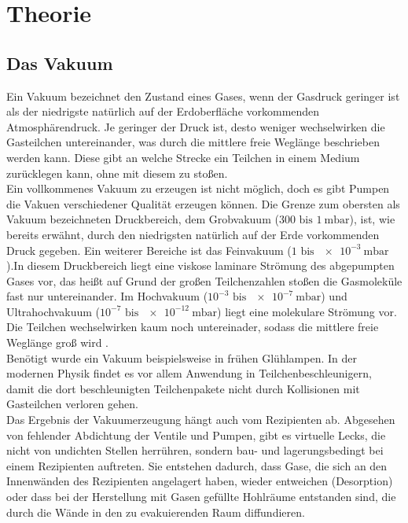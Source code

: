 
\section{Theorie}
\label{sec:Theorie}

\subsection{Das Vakuum}

Ein Vakuum bezeichnet den Zustand eines Gases, wenn der Gasdruck geringer ist als der niedrigste natürlich auf der Erdoberfläche vorkommenden Atmosphärendruck\cite{Pfeiffer}. Je geringer der Druck ist, desto weniger wechselwirken die Gasteilchen untereinander, was durch die mittlere freie Weglänge beschrieben werden kann. Diese gibt an welche Strecke ein Teilchen in einem Medium zurücklegen kann, ohne mit diesem zu stoßen.\\
Ein vollkommenes Vakuum zu erzeugen ist nicht möglich, doch es gibt Pumpen die Vakuen verschiedener Qualität erzeugen können. Die Grenze zum obersten als Vakuum bezeichneten Druckbereich, dem Grobvakuum ($300 \text{ bis } \SI{1}{\milli\bar}$), ist, wie bereits erwähnt, durch den niedrigsten natürlich auf der Erde vorkommenden Druck gegeben. Ein weiterer Bereiche ist das Feinvakuum ($1 \text{ bis } \SI{e-3}{\milli\bar}$).In diesem Druckbereich liegt eine viskose laminare Strömung des abgepumpten Gases vor, das heißt auf Grund der großen Teilchenzahlen stoßen die Gasmoleküle fast nur untereinander. Im Hochvakuum ($10^{-3} \text{ bis } \SI{e-7}{\milli\bar}$) und Ultrahochvakuum ($10^{-7} \text{ bis } \SI{e-12}{\milli\bar}$) liegt eine molekulare Strömung vor. Die Teilchen wechselwirken kaum noch untereinader, sodass die mittlere freie Weglänge groß wird \cite{Pfeiffer}.\\
Benötigt wurde ein Vakuum beispielsweise in frühen Glühlampen. In der modernen Physik findet es vor allem Anwendung in Teilchenbeschleunigern, damit die dort beschleunigten Teilchenpakete nicht durch Kollisionen mit Gasteilchen verloren gehen.\\
Das Ergebnis der Vakuumerzeugung hängt auch vom Rezipienten ab. Abgesehen von fehlender Abdichtung der Ventile und Pumpen, gibt es virtuelle Lecks, die nicht von undichten Stellen herrühren, sondern bau- und lagerungsbedingt bei einem Rezipienten auftreten. Sie entstehen dadurch, dass Gase, die sich an den Innenwänden des Rezipienten angelagert haben, wieder entweichen (Desorption) oder dass bei der Herstellung mit Gasen gefüllte Hohlräume entstanden sind, die durch die Wände in den zu evakuierenden Raum diffundieren.


